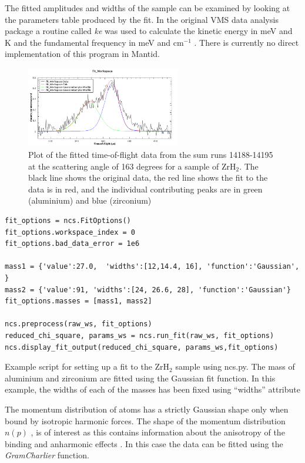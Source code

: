 \documentclass[paper=a4, fontsize=11pt]{scrartcl}	%
\numberwithin{equation}{section}															%
\numberwithin{figure}{section}																%
\numberwithin{table}{section}
\begin{document}
The fitted amplitudes and widths of the sample can be examined by looking at the parameters table produced by the fit. In the original VMS data analysis package a routine called \textit{ke} was used to calculate the kinetic energy in meV and K and the fundamental frequency in meV and cm$^{-1}$ \cite{mayers2010user}. There is currently no direct implementation of this program in Mantid.

\begin{figure}[H]
\centering
\includegraphics[width=0.6\textwidth]{img/gaussian-fit-example.png}
\caption{Plot of the fitted time-of-flight data from the sum runs 14188-14195 at the scattering angle of 163 degrees for a sample of ZrH$_2$. The black line shows the original data, the red line shows the fit to the data is in red, and the individual contributing peaks are in green (aluminium) and blue (zirconium)}
\label{fig:gaussian-example-fit}
\end{figure}

\begin{listing}[H]
\begin{verbatim}
fit_options = ncs.FitOptions()
fit_options.workspace_index = 0
fit_options.bad_data_error = 1e6

mass1 = {'value':27.0,  'widths':[12,14.4, 16], 'function':'Gaussian', }
mass2 = {'value':91, 'widths':[24, 26.6, 28], 'function':'Gaussian'}
fit_options.masses = [mass1, mass2]

ncs.preprocess(raw_ws, fit_options)
reduced_chi_square, params_ws = ncs.run_fit(raw_ws, fit_options)
ncs.display_fit_output(reduced_chi_square, params_ws,fit_options)
\end{verbatim}
\caption{Example script for setting up a fit to the ZrH$_2$ sample using ncs.py. The mass of aluminium and zirconium are fitted using the Gaussian fit function. In this example, the widths of each of the masses has been fixed using ``widths'' attribute}
\label{lst:fit-setup}
\end{listing}

The momentum distribution of atoms has a strictly Gaussian shape only when bound by isotropic harmonic forces. The shape of the momentum distribution $n(p)$ \cite{mayers2004vesuvio}, is of interest as this contains information about the anisotropy of the binding and anharmonic effects \cite{andreani2005measurement}. In this case the data can be fitted using the \textit{GramCharlier} function. 
\end{document}
